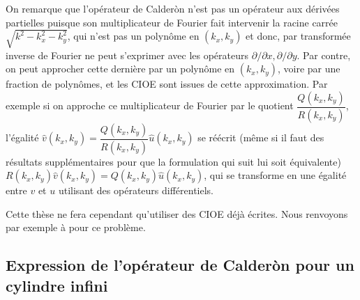 \documentclass[12pt,%
    twoside,%
    a4paper,%
    openright, %
    ]{book}
\numberwithin{equation}{section} %
\renewcommand{\frac}[2]{\dfrac{#1}{#2}} %
\newcounter{REM}
\newenvironment{REM}[1][\theREM]
    {%
        \stepcounter{REM}
        \hypertarget{REM#1}{}%
        \pdfbookmark[0]{REM \theREM}{REM#1}
        \begin{tcolorbox}[%
                title={Remarque \theREM},%
                colback=red!30!white,%
                colframe=red!75!black,%
            ]
    }
    {
        \end{tcolorbox}%
    }%
\begin{document}
    On remarque que l'opérateur de Calderòn n'est pas un opérateur aux dérivées partielles puisque son multiplicateur de Fourier fait intervenir la racine carrée \(\sqrt{k^2-k_x^2 - k_y^2}\), qui n'est pas un polynôme en $(k_x,k_y)$ et donc, par transformée inverse de Fourier ne peut s'exprimer avec les opérateurs \(\partial/\partial x, \partial / \partial y\).
    Par contre, on peut approcher cette dernière par un polynôme en \((k_x,k_y)\), voire par une fraction de polynômes, et les CIOE sont issues de cette approximation.
    Par exemple si on approche ce multiplicateur de Fourier par le quotient \(\frac{Q(k_x,k_y)}{R(k_x,k_y)}\), l'égalité \({\hat v}(k_x,k_y)=\frac{Q(k_x,k_y)}{R(k_x,k_y)}{\hat u}(k_x,k_y)\) se réécrit (même si il faut des résultats supplémentaires pour que la formulation qui suit lui soit équivalente) \(R(k_x,k_y){\hat v}(k_x,k_y)=Q(k_x,k_y){\hat u}(k_x,k_y)\), qui se transforme en une égalité entre $v$ et $u$ utilisant des opérateurs différentiels.
    
    Cette thèse ne fera cependant qu'utiliser des CIOE déjà écrites.
    Nous renvoyons par exemple à \cite{senior_approximate_1995} pour ce problème.

  \subsection{Expression de l'opérateur de Calderòn pour un cylindre infini}

    
\end{document}
